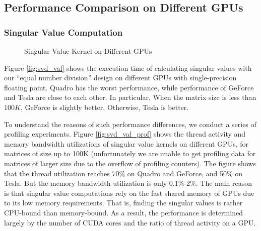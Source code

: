 \vspace{-0.1in}
\subsection{Performance Comparison on Different GPUs}
\subsubsection{Singular Value Computation}
\begin{figure}[hbpt]
\vspace{-0.3in}
\centering
\vspace{-0.1in}
  \caption{Singular Value Kernel on Different GPUs}
  \label{fig:svdval}
\vspace{-0.3in}
\end{figure}

Figure \ref{fig:svd_val} shows the execution time of calculating singular values with our ``equal number division'' design on different GPUs with single-precision floating point.
Quadro has the worst performance, while performance of GeForce and Tesla are close to each other.
In particular, When the matrix size is less than $100K$, GeForce is slightly better. Otherwise, Tesla is better. 

To understand the reasons
of such performance differences, we conduct a series of profiling experiments.
Figure \ref{fig:svd_val_prof} shows the thread activity and memory bandwidth utilizations of singular value kernels on different GPUs, for matrices of size up to 
100K (unfortunately we are unable to get profiling data for matrices of larger size due to the overflow of profiling counters). 
The figure shows that the thread utilization reaches 70\% on Quadro and GeForce, and 50\% on Tesla. 
But the memory bandwidth utilization is only 0.1\%-2\%.
The main reason is that singular value computations rely on the fast shared memory
of GPUs due to its low memory requirements. That is, finding the singular
values is rather CPU-bound than memory-bound. 
As a result, the performance is determined largely by the number of CUDA cores and the ratio of thread activity on a GPU.

\vspace{-0.2in}
